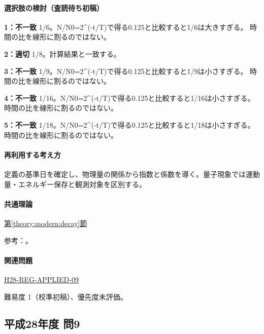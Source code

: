 \paragraph{選択肢の検討（査読待ち初稿）}\mbox{}\par

\noindent\textbf{1：不一致} 1/6。N/N0=\allowbreak{}2\textasciicircum{}(-t/T)で得る0.125と比較すると1/6は大きすぎる。 時間の比を線形に割るのではない。\par

\noindent\textbf{2：適切} 1/8。計算結果と一致する。\par

\noindent\textbf{3：不一致} 1/9。N/N0=\allowbreak{}2\textasciicircum{}(-t/T)で得る0.125と比較すると1/9は小さすぎる。 時間の比を線形に割るのではない。\par

\noindent\textbf{4：不一致} 1/16。N/N0=\allowbreak{}2\textasciicircum{}(-t/T)で得る0.125と比較すると1/16は小さすぎる。 時間の比を線形に割るのではない。\par

\noindent\textbf{5：不一致} 1/18。N/N0=\allowbreak{}2\textasciicircum{}(-t/T)で得る0.125と比較すると1/18は小さすぎる。 時間の比を線形に割るのではない。\par

\paragraph{再利用する考え方} 定義の基準日を確定し、物理量の関係から指数と係数を導く。量子現象では運動量・エネルギー保存と観測対象を区別する。

\paragraph{共通理論} \hyperref[theory:modern:decay]{第\ref*{theory:modern:decay}節}

\par 参考：\cite{modern_mit_nuclear}。

\paragraph{関連問題} \hyperref[q:h28-reg-applied-09]{H28-REG-APPLIED-09}

\par 難易度 1（校準初稿）、優先度未評価。

\subsection{平成28年度 問9}
\label{q:h28-reg-applied-09}

